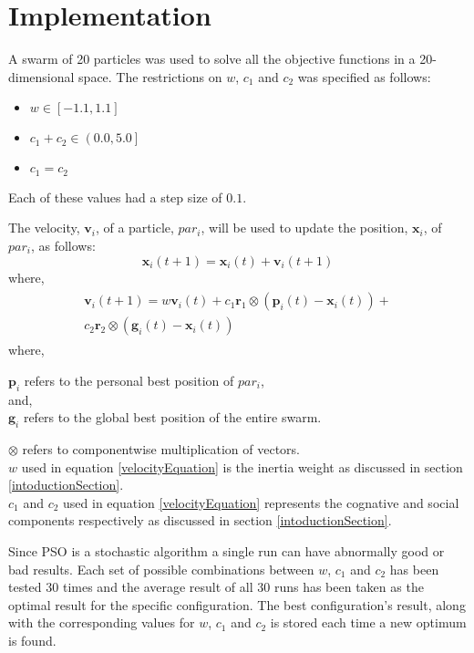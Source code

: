\documentclass[hidelinks,english,conference]{IEEEtran}
\begin{document}
\section{Implementation}
A swarm of 20 particles was used to solve all the objective functions in a 20-dimensional space. The restrictions on $w$, $c_1$ and $c_2$ was specified as follows:
\begin{itemize}
	\item $w \in \left[-1.1, 1.1\right]$
	\item $c_1 + c_2 \in \left(0.0, 5.0\right]$
	\item $c_1 = c_2$
\end{itemize}

Each of these values had a step size of $0.1$.

The velocity, $\textbf{v}_i$, of a particle, $par_i$, will be used to update the position, $\textbf{x}_i$, of $par_i$, as follows:\\
\begin{equation}
	\textbf{x}_i(t+1)=\textbf{x}_i(t) + \textbf{v}_i(t+1)
\end{equation}
where,
\begin{align}\label{velocityEquation}
\begin{split}
	\textbf{v}_i(t+1)=w\textbf{v}_i(t) + c_1\textbf{r}_1 \otimes (\textbf{p}_i(t) - \textbf{x}_i(t)) +\\c_2\textbf{r}_2 \otimes (\textbf{g}_i(t) - \textbf{x}_i(t))
\end{split}
\end{align}
where,\\
\begin{center}
	$\textbf{p}_i$ refers to the personal best position of $par_i$,\\
	and,\\
	$\textbf{g}_i$ refers to the global best position of the entire swarm.
\end{center}

$\otimes$ refers to componentwise multiplication of vectors.\\
$w$ used in equation \ref{velocityEquation} is the inertia weight as discussed in section \ref{intoductionSection}.\\
$c_{1}$ and $c_{2}$  used in equation \ref{velocityEquation} represents the cognative and social components respectively as discussed in section \ref{intoductionSection}.

Since PSO is a stochastic algorithm a single run can have abnormally good or bad results. Each set of possible combinations between $w$, $c_{1}$ and $c_{2}$ has been tested 30 times and the average result of all 30 runs has been taken as the optimal result for the specific configuration. The best configuration's result, along with the corresponding values for $w$, $c_{1}$ and $c_{2}$ is stored each time a new optimum is found.
\end{document}
